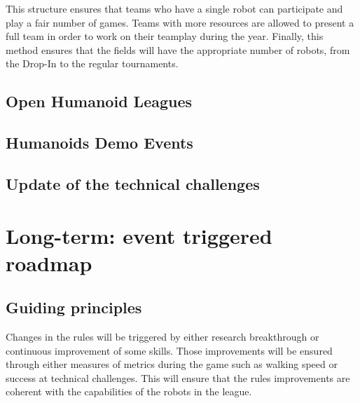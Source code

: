 \documentclass{article}
\begin{document}
This structure ensures that teams who have a single robot can participate and
play a fair number of games.
Teams with more resources are allowed to present a full team in order to work
on their teamplay during the year.
Finally, this method ensures that the fields will have the appropriate number
of robots, from the Drop-In to the regular tournaments.

\subsection{Open Humanoid Leagues}

\subsection{Humanoids Demo Events}

\subsection{Update of the technical challenges}

\section{\label{sec:LongTerm}Long-term: event triggered roadmap}



\subsection{Guiding principles}

Changes in the rules will be triggered by either research breakthrough or
continuous improvement of some skills. Those improvements will be ensured
through either measures of metrics during the game such as walking speed or
success at technical challenges. This will ensure that the rules improvements
are coherent with the capabilities of the robots in the league.
\end{document}
